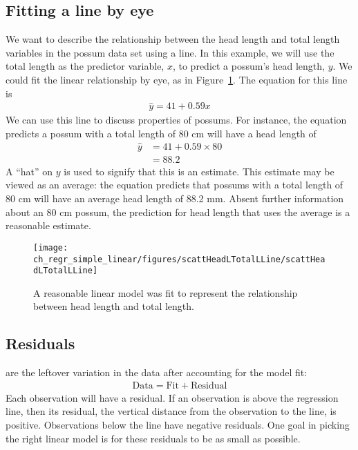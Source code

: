\textC{\newpage}

\subsection{Fitting a line by eye}

We want to describe the relationship between the head length and total length variables in the possum data set using a line. In this example, we will use the total length as the predictor variable, $x$, to predict a possum's head length, $y$. We could fit the linear relationship by eye, as in Figure~\ref{scattHeadLTotalLLine}. The equation for this line is
\begin{eqnarray}
\hat{y} = 41 + 0.59x
\label{headLLinModTotalL}
\end{eqnarray}
We can use this line to discuss properties of possums. For instance, the equation predicts a possum with a total length of 80 cm will have a head length of
\begin{align*}
\hat{y} &= 41 + 0.59\times 80 \\
	&= 88.2 %
\end{align*}
A ``hat'' on $y$ is used to signify that this is an estimate. This estimate may be viewed as an average: the equation predicts that possums with a total length of 80 cm will have an average head length of 88.2 mm. Absent further information about an 80 cm possum, the prediction for head length that uses the average is a reasonable estimate.

\begin{figure}
   \centering
   \texttt{[image: ch\_regr\_simple\_linear/figures/scattHeadLTotalLLine/scattHeadLTotalLLine]}
   \caption{A reasonable linear model was fit to represent the relationship between head length and total length.\textC{\vspace{-2mm}}}
   \label{scattHeadLTotalLLine}
\end{figure}

\subsection{Residuals}


 are the leftover variation in the data after accounting for the model fit:
\begin{align*}
\text{Data} = \text{Fit} + \text{Residual}
\end{align*}
Each observation will have a residual. If an observation is above the regression line, then its residual, the vertical distance from the observation to the line, is positive. Observations below the line have negative residuals. One goal in picking the right linear model is for these residuals to be as small as possible.

